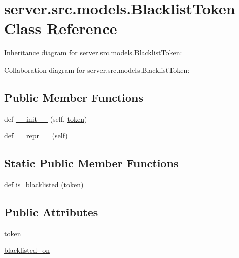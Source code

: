 \hypertarget{classserver_1_1src_1_1models_1_1_blacklist_token}{}\section{server.\+src.\+models.\+Blacklist\+Token Class Reference}
\label{classserver_1_1src_1_1models_1_1_blacklist_token}


Inheritance diagram for server.\+src.\+models.\+Blacklist\+Token\+:


Collaboration diagram for server.\+src.\+models.\+Blacklist\+Token\+:
\subsection*{Public Member Functions}
\begin{DoxyCompactItemize}
\item 
def \hyperlink{classserver_1_1src_1_1models_1_1_blacklist_token_ac2ae48dca5eb7e96ea4e9a8182f64733}{\+\_\+\+\_\+init\+\_\+\+\_\+} (self, \hyperlink{classserver_1_1src_1_1models_1_1_blacklist_token_abaecaf1295a403b0076f0e697b039446}{token})
\item 
def \hyperlink{classserver_1_1src_1_1models_1_1_blacklist_token_a10c76af77f6587061a4d60c801c676e8}{\+\_\+\+\_\+repr\+\_\+\+\_\+} (self)
\end{DoxyCompactItemize}
\subsection*{Static Public Member Functions}
\begin{DoxyCompactItemize}
\item 
def \hyperlink{classserver_1_1src_1_1models_1_1_blacklist_token_a725dffaf3b5a287f526413062cd74f13}{is\+\_\+blacklisted} (\hyperlink{classserver_1_1src_1_1models_1_1_blacklist_token_abaecaf1295a403b0076f0e697b039446}{token})
\end{DoxyCompactItemize}
\subsection*{Public Attributes}
\begin{DoxyCompactItemize}
\item 
\hyperlink{classserver_1_1src_1_1models_1_1_blacklist_token_abaecaf1295a403b0076f0e697b039446}{token}
\item 
\hyperlink{classserver_1_1src_1_1models_1_1_blacklist_token_aa570f37f26f83acb4f65168b2c043bc4}{blacklisted\+\_\+on}
\end{DoxyCompactItemize}


